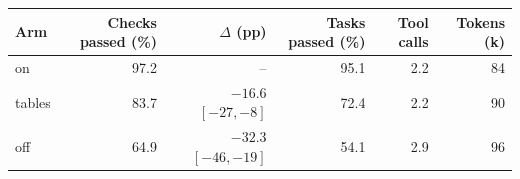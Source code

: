 \begin{tabular}{lrrrrr}
\toprule
Arm & Checks passed (\%) & $\Delta$ (pp) & Tasks passed (\%) & Tool calls & Tokens (k) \\
\midrule
on & 97.2 & -- & 95.1 & 2.2 & 84 \\
tables & 83.7 & $-16.6$ $[-27, -8]$ & 72.4 & 2.2 & 90 \\
off & 64.9 & $-32.3$ $[-46, -19]$ & 54.1 & 2.9 & 96 \\
\bottomrule
\end{tabular}
